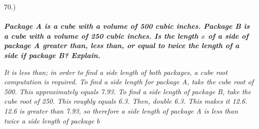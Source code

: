 \documentclass[12pt]{article}
\begin{document}
{\setlength{\parindent}{0cm}
70.) 
\paragraph{} \textbf{\textit{Package A is a cube with a volume of 500 cubic inches. Package B is a cube with a volume of 250 cubic inches. Is the length $x$ of a side of package A greater than, less than, or equal to twice the length of a side if package B? Explain.}}
\begin{center} \textit{It is less than; in order to find a side length of both packages, a cube root computation is required. To find a side length for package A, take the cube root of 500. This approximately equals 7.93. To find a side length of package B, take the cube root of 250. This roughly equals 6.3. Then, double 6.3. This makes it 12.6. 12.6 is greater than 7.93, so therefore a side length of package A is less than twice a side length of package b } \end{center}
}
\end{document}

